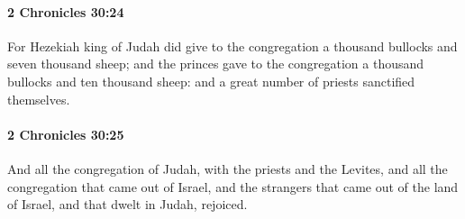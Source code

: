 		\paragraph{2 Chronicles 30:24} %
			\label{2CHRONICLES-30-24}

			For Hezekiah king of Judah did give to the congregation a thousand bullocks and seven thousand sheep; and the princes gave to the congregation a thousand bullocks and ten thousand sheep: and a great number of priests sanctified themselves.


		\paragraph{2 Chronicles 30:25} %
			\label{2CHRONICLES-30-25}

			And all the congregation of Judah, with the priests and the Levites, and all the congregation that came out of Israel, and the strangers that came out of the land of Israel, and that dwelt in Judah, rejoiced.

